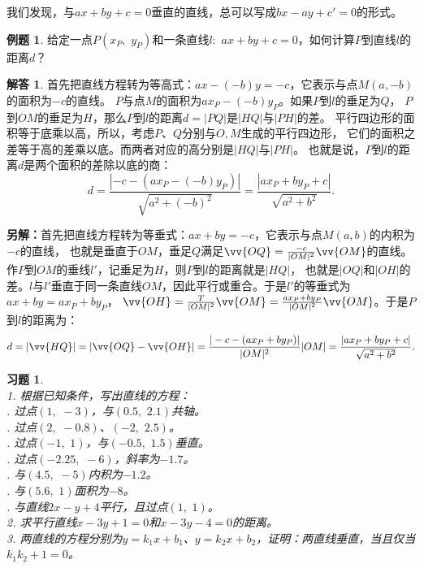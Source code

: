 \documentclass[12pt,UTF8]{ctexbook}
\theoremstyle{definition}
\newtheorem{et}{例题}[section]
\newtheorem*{so}{解答}
\theoremstyle{plain}
\newtheorem{xt}{习题}[section]
\begin{document}
我们发现，与$ax + by + c = 0$垂直的直线，总可以写成$bx - ay + c' = 0$的形式。

\begin{et}
    给定一点$P(x_P, \,\,y_P)$和一条直线$l: \,\, ax + by + c = 0$，如何计算$P$到直线$l$的距离$d$？
\end{et}
\begin{so}
    首先把直线方程转为等高式：$ax - (-b)y = -c$，它表示与点$M(a, -b)$的面积为$-c$的直线。
$P$与点$M$的面积为$ax_P - (-b)y_P$。如果$P$到$l$的垂足为$Q$，
$P$到$OM$的垂足为$H$，那么$P$到$l$的距离$d = |PQ|$是$|HQ|$与$|PH|$的差。
平行四边形的面积等于底乘以高，所以，考虑$P$、$Q$分别与$O, M$生成的平行四边形，
它们的面积之差等于高的差乘以底。而两者对应的高分别是$|HQ|$与$|PH|$。
也就是说，$P$到$l$的距离$d$是两个面积的差除以底的商：
$$ d = \frac{|-c - (ax_P - (-b)y_P)|}{\sqrt{a^2 + (-b)^2}} = \frac{|ax_P + by_P + c|}{\sqrt{a^2 + b^2}}.$$

\textbf{另解：}首先把直线方程转为等垂式：$ax + by = -c$，它表示与点$M(a, b)$的内积为$-c$的直线，
也就是垂直于$OM$，垂足$Q$满足$\vv{OQ} = \frac{-c}{|OM|^2}\vv{OM}$的直线。作$P$到$OM$的垂线$l'$，记垂足为$H$，则$P$到$l$的距离就是$|HQ|$，
也就是$|OQ|$和$|OH|$的差。$l$与$l'$垂直于同一条直线$OM$，因此平行或重合。于是$l'$的等垂式为$ax + by = ax_P + by_P$，
$\vv{OH} = \frac{T}{|OM|^2}\vv{OM} = \frac{ax_P + by_P}{|OM|^2}\vv{OM}$。于是$P$到$l$的距离为：
$$ d = |\vv{HQ}| = |\vv{OQ} - \vv{OH}| = \frac{|-c - (ax_P + by_P)|}{|OM|^2} |OM| = \frac{|ax_P + by_P + c|}{\sqrt{a^2 + b^2}}. $$
\end{so}

\begin{xt}
    \mbox{}\\
    1. 根据已知条件，写出直线的方程：\\
    . 过点$(1, \,\,-3)$，与$(0.5, \,\,2.1)$共轴。\\
    . 过点$(2, \,\,-0.8)$、$(-2, \,\,2.5)$。\\
    . 过点$(-1, \,\,1)$，与$(-0.5, \,\,1.5)$垂直。\\
    . 过点$(-2.25, \,\,-6)$，斜率为$-1.7$。\\
    . 与$(4.5,\,\, -5)$内积为$-1.2$。\\
    . 与$(5.6, \,\,1)$面积为$-8$。\\
    . 与直线$2x - y + 4$平行，且过点$(1, \,\, 1)$。 \\
    2. 求平行直线$x - 3y + 1 = 0$和$x - 3y - 4 = 0$的距离。 \\
    3. 两直线的方程分别为$y = k_1 x + b_1$、$y = k_2 x + b_2$，证明：两直线垂直，当且仅当$k_1k_2 + 1 = 0$。
\end{xt}
\end{document}
